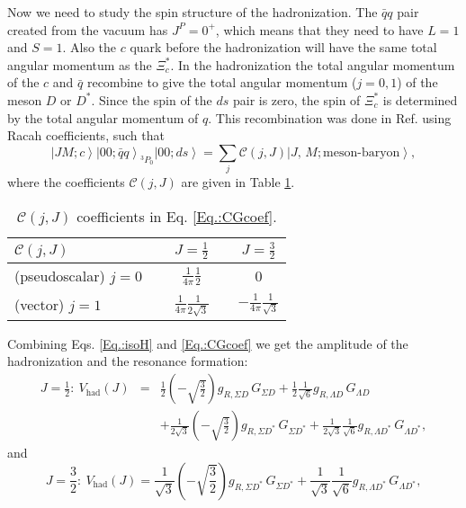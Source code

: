 \documentclass{PoS}
\begin{document}
Now we need to study the spin structure of the hadronization. The $\bar{q}q$ pair created from the vacuum has $J^P=0^+$, which means that they need to have $L=1$ and $S=1$. Also the $c$ quark before the hadronization will have the same total angular momentum as the $\Xi_c^*$. 
In the hadronization the total angular momentum of the $c$ and $\bar{q}$ recombine to give the total angular momentum ($j=0,1$) of the meson $D$ or $D^*$. Since the spin of the $ds$ pair is zero, the spin of $\Xi_c^*$ is determined by the total angular momentum of $q$. This recombination was done in Ref.\cite{weihong} using Racah coefficients, such that
\begin{equation}\label{Eq.:CGcoef}
\left|J M; c \right> \left|0 0; \bar{q}q \right>_{^3P_0} \left|0  0; ds \right> 
  = \sum_j \mathcal{C}(j,J) \left|J, \, M; \text{meson-baryon}\right>,
\end{equation}
where the coefficients $\mathcal{C}(j,J)$ are given in Table \ref{tab:tab1}.
\begin{table}[tbp!]
\centering
\caption{$\mathcal{C}(j,J)$ coefficients in Eq. \eqref{Eq.:CGcoef}.\label{tab:tab1}}
\begin{tabular}{l|cc}
\hline\hline
$\mathcal{C}(j,J)$ & $J=\frac{1}{2}$ & $J=\frac{3}{2}$ \\ \hline
(pseudoscalar) $j=0~$ & $\frac{1}{4 \pi} \frac{1}{2}$ & 0 \\
(vector) $j=1$ & ~~$\frac{1}{4 \pi} \frac{1}{2\sqrt{3}}$~~ & $-\frac{1}{4 \pi} \frac{1}{\sqrt{3}}$ \\
\hline\hline
\end{tabular}
\end{table}
Combining Eqs. \eqref{Eq.:isoH} and \eqref{Eq.:CGcoef} we get the amplitude of the hadronization and the resonance formation:
\begin{eqnarray}\label{Eq.:sum12}
   J=\frac{1}{2}: \ V_{\text{had}}(J) &=&  \frac{1}{2} \left(-\sqrt{\frac{3}{2}}\right) g_{R,\Sigma D}\,G_{\Sigma D}  + \frac{1}{2} \frac{1}{\sqrt{6}}  g_{R,\Lambda  D}\,G_{\Lambda D} \nonumber \\
   &&  + \frac{1}{2\sqrt{3}}\left(-\sqrt{\frac{3}{2}}\right) g_{R,\Sigma D^*}\,G_{\Sigma D^*} + \frac{1}{2\sqrt{3}}  \frac{1}{\sqrt{6}} g_{R,\Lambda  D^*}\, G_{\Lambda D^*},
\end{eqnarray}
and
\begin{equation}
\label{Eq.:sum32}
J=\frac{3}{2}: \ V_{\text{had}}(J) = \frac{1}{\sqrt{3}} \left(-\sqrt{\frac{3}{2}}\right)g_{R,\Sigma D^*}\, G_{\Sigma D^*} + \frac{1}{\sqrt{3}}  \frac{1}{\sqrt{6}} g_{R,\Lambda  D^*}\,G_{\Lambda D^*},
\end{equation}
\end{document}
